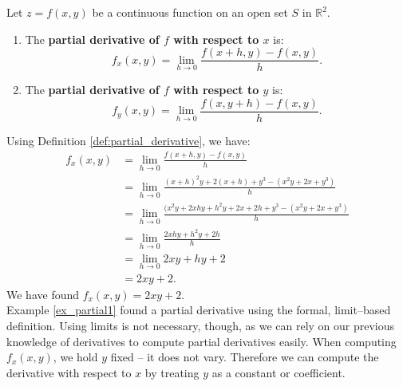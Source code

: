 {Let $z=f(x,y)$ be a continuous function on an open set $S$ in $\mathbb{R}^2$.
\begin{enumerate}
	\item The \textbf{partial derivative of $f$ with respect to $x$} is:
	$$f_x(x,y) = \lim_{h\to 0} \frac{f(x+h,y) - f(x,y)}h.$$
	\item The \textbf{partial derivative of $f$ with respect to $y$} is:
	$$f_y(x,y) = \lim_{h\to 0} \frac{f(x,y+h) - f(x,y)}h.$$
	
	\end{enumerate}
}

{Using Definition \ref{def:partial_derivative}, we have:
\begin{align*}
f_x(x,y) &= \lim_{h\to 0} \frac{f(x+h,y) - f(x,y)}{h} \\
				&= \lim_{h\to 0} \frac{(x+h)^2y+2(x+h)+y^3 - (x^2y+2x+y^3)}{h}\\
				&= \lim_{h\to 0} \frac{(x^2y+2xhy+h^2y+2x+2h+y^3-(x^2y+2x+y^3)}{h}\\
				&= \lim_{h\to 0} \frac{2xhy+h^2y+2h}{h}\\
				&=\lim_{h\to 0} 2xy+hy+2\\
				&= 2xy+2.
\end{align*}
We have found $f_x(x,y) = 2xy+2$.
}\\

Example \ref{ex_partial1} found a partial derivative using the formal, limit--based definition. Using limits is not necessary, though, as we can rely on our previous knowledge of derivatives to compute partial derivatives easily. When computing $f_x(x,y)$, we hold $y$ fixed -- it does not vary. Therefore we can compute the derivative with respect to $x$ by treating $y$ as a constant or coefficient. 

